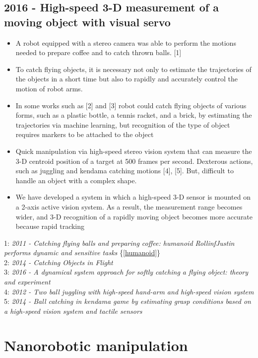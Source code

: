 \subsection{2016 - High-speed 3-D measurement of a moving object with visual servo}
\begin{itemize}
\item A robot equipped with a stereo camera was able to perform the motions needed to prepare coffee and to catch thrown balls. [1]
\item To catch flying objects, it is necessary not only to estimate the trajectories of the objects in a short time but also to rapidly and accurately control the motion of robot arms.
\item In some works such as [2] and [3] robot could catch flying objects of various forms, such as a plastic bottle, a tennis racket, and a brick, by estimating the trajectories via machine learning, but recognition of the type of object requires markers to be attached to the object
\item Quick manipulation via high-speed stereo vision system that can measure the 3-D centroid position of a target at 500 frames per second. Dexterous actions, such as juggling and kendama catching motions [4], [5]. But, difficult to handle an object with a complex shape.
\item  We have developed a system in which a high-speed 3-D sensor is mounted on a 2-axis active vision system. As a result, the measurement range becomes wider, and 3-D recognition of a
rapidly moving object becomes more accurate because rapid
tracking
\end{itemize}
1: \textit{2011 -  Catching flying balls and preparing coffee: humanoid RollinfJustin performs dynamic and sensitive tasks} \{\ref{humanoid}\} \\
2: \textit{2014 -  Catching Objects in Flight} \\
3: \textit{2016 - A dynamical system
approach for softly catching a flying object: theory and experiment} \\
4: \textit{2012 - Two ball
juggling with high-speed hand-arm and high-speed vision system} \\
5: \textit{2014 - Ball catching in kendama game by estimating
grasp conditions based on a high-speed vision system and tactile
sensors}

\section{Nanorobotic manipulation}
